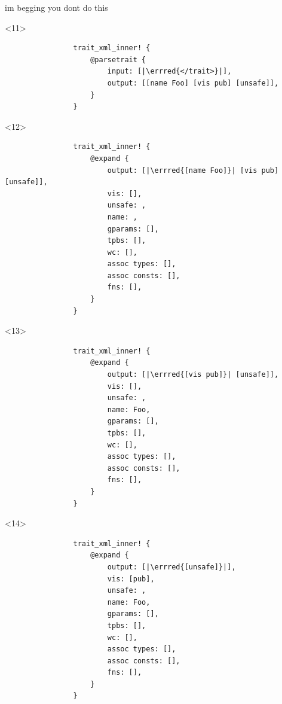 \documentclass{beamer}
\newcommand{\errred}[1]{{\color{errredcolour}#1}}
\begin{document}
\begin{frame}[fragile]{im begging you dont do this}
		\pause

		\begin{onlyenv}<11>
			\begin{verbatim}
				trait_xml_inner! {
					@parsetrait {
						input: [|\errred{</trait>}|],
						output: [[name Foo] [vis pub] [unsafe]],
					}
				}
			\end{verbatim}
		\end{onlyenv}

		\pause

		\begin{onlyenv}<12>
			\begin{verbatim}
				trait_xml_inner! {
					@expand {
						output: [|\errred{[name Foo]}| [vis pub] [unsafe]],
						vis: [],
						unsafe: ,
						name: ,
						gparams: [],
						tpbs: [],
						wc: [],
						assoc types: [],
						assoc consts: [],
						fns: [],
					}
				}
			\end{verbatim}
		\end{onlyenv}

		\pause

		\begin{onlyenv}<13>
			\begin{verbatim}
				trait_xml_inner! {
					@expand {
						output: [|\errred{[vis pub]}| [unsafe]],
						vis: [],
						unsafe: ,
						name: Foo,
						gparams: [],
						tpbs: [],
						wc: [],
						assoc types: [],
						assoc consts: [],
						fns: [],
					}
				}
			\end{verbatim}
		\end{onlyenv}

		\pause

		\begin{onlyenv}<14>
			\begin{verbatim}
				trait_xml_inner! {
					@expand {
						output: [|\errred{[unsafe]}|],
						vis: [pub],
						unsafe: ,
						name: Foo,
						gparams: [],
						tpbs: [],
						wc: [],
						assoc types: [],
						assoc consts: [],
						fns: [],
					}
				}
			\end{verbatim}
		\end{onlyenv}

		\pause


\end{frame}
\end{document}
